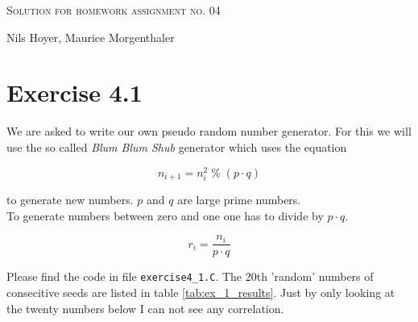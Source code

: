 \documentclass[10pt]{article}
\newenvironment{myfont}{\fontfamily{put}\selectfont}{\par}
\begin{document}
\begin{myfont}

\begin{center}
  \begin{Large}
    \textsc{Solution for homework assignment no. 04} \\
  \end{Large}
	\vspace*{0.4cm}
    Nils Hoyer, Maurice Morgenthaler
  \vspace*{1cm}
\end{center}

\section*{Exercise 4.1}

We are asked to write our own pseudo random number generator.
For this we will use the so called \textit{Blum Blum Shub} generator which uses the equation

\begin{equation}
n_{i+1} = n_{i}^{2} \;\%\; (p \cdot q)
\end{equation}

\noindent to generate new numbers.
$p$ and $q$ are large prime numbers. \\
To generate numbers between zero and one one has to divide by $p \cdot q$.

\begin{equation}
r_{i} = \frac{n_{i}}{p \cdot q}
\end{equation}

\noindent Please find the code in file \texttt{exercise4\_1.C}.
The 20th 'random' numbers of consecitive seeds are listed in table \ref{tab:ex_1_results}.
Just by only looking at the twenty numbers below I can not see any correlation.


\end{myfont}
\end{document}
